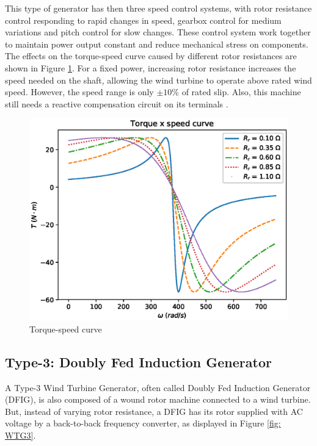 This type of generator has then three speed control systems, with rotor resistance control responding to rapid changes in speed, gearbox control for medium variations and pitch control for slow changes. These control system work together to maintain power output constant and reduce mechanical stress on components. The effects on the torque-speed curve caused by different rotor resistances are shown in Figure \ref{fig: Tw}. For a fixed power, increasing rotor resistance increases the speed needed on the shaft, allowing the wind turbine to operate above rated wind speed. However, the speed range is only $\pm 10\%$ of rated slip. Also, this machine still needs a reactive compensation circuit on its terminals \cite{Muljadi2010}.

\begin{figure}[h]
	\caption{Torque-speed curve}
	\begin{center}
		\includegraphics[scale=.7]{Images/Tw_curve.eps}
	\end{center}
	\label{fig: Tw}
\end{figure}

\subsection{Type-3: Doubly Fed Induction Generator}

A Type-3 Wind Turbine Generator, often called Doubly Fed Induction Generator (DFIG), is also composed of a wound rotor machine connected to a wind turbine. But, instead of varying rotor resistance, a DFIG has its rotor supplied with AC voltage by a back-to-back frequency converter, as displayed in Figure \ref{fig: WTG3}. 

